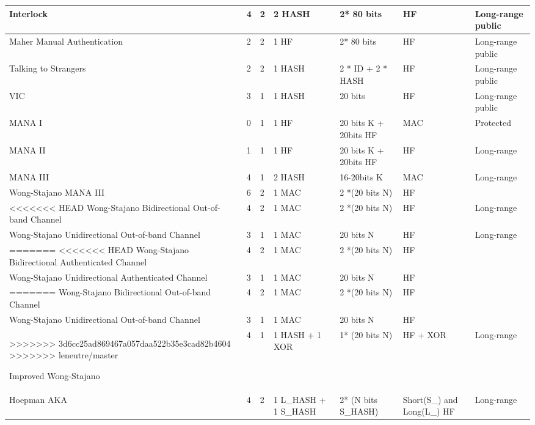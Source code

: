 \begin{enumerate}
\begin{enumerate}
\begin{table}[ht]
{\begin{tabular}{ | p{2cm} | p{1.4cm} | p{1.4cm} | p{2cm} | p{2.2cm} | p{2cm} | p{2cm}| }
Interlock & 4 & 2 & 2 HASH & 2* 80 bits & HF & Long-range public \\ \hline

Maher Manual Authentication & 2 & 2 & 1 HF & 2* 80 bits & HF & Long-range public \\ \hline

Talking to Strangers & 2 &	 2	& 1  HASH &	 2 * ID + 2 * HASH	& HF	&  Long-range public \\ \hline 

VIC & 3	& 1	& 1 HASH 	 & 20 bits & HF & Long-range public \\ \hline 

MANA I	& 0	& 1	& 1 HF & 20 bits K + 20bits HF  & MAC & Protected\\ \hline 

MANA II	& 1	& 1 & 1 HF & 20 bits K + 20bits HF	& HF & Long-range \\ \hline 

MANA III	& 4	& 1 & 2  HASH	& 16-20bits K & MAC & Long-range\\ \hline 

Wong-Stajano MANA III & 6 & 2	& 1 MAC	& 2 *(20 bits N) & HF & \\ \hline 

<<<<<<< HEAD
Wong-Stajano Bidirectional Out-of-band Channel & 4	 & 2	& 1 MAC & 2 *(20 bits N) 	 & HF	 & Long-range\\ \hline 

Wong-Stajano Unidirectional Out-of-band Channel & 3 &	 1	& 1 MAC	 & 20 bits N &	 HF & Long-range \\ \hline 
=======
<<<<<<< HEAD
Wong-Stajano Bidirectional Authenticated Channel & 4	 & 2	& 1 MAC & 2 *(20 bits N) 	 & HF	 & \\ \hline 

Wong-Stajano Unidirectional Authenticated Channel & 3 &	 1	& 1 MAC	 & 20 bits N &	 HF & \\ \hline 
=======
Wong-Stajano Bidirectional Out-of-band Channel & 4	 & 2	& 1 MAC & 2 *(20 bits N) 	 & HF	 & \\ \hline 

Wong-Stajano Unidirectional Out-of-band Channel & 3 &	 1	& 1 MAC	 & 20 bits N &	 HF & \\ \hline 
>>>>>>> 3d6cc25ad869467a057daa522b35e3cad82b4604
>>>>>>> leneutre/master

Improved Wong-Stajano & 4	& 1	& 1 HASH + 1 XOR	 & 1* (20 bits N) &	 HF + XOR & Long-range \\ \hline 

Hoepman AKA & 4	& 2 &	 1 L\_HASH + 1 S\_HASH & 	2* (N bits S\_HASH) &	 Short(S\_) and Long(L\_) HF & Long-range \\ \hline 


\end{tabular}}
\end{table}
\end{enumerate}
\end{enumerate}
